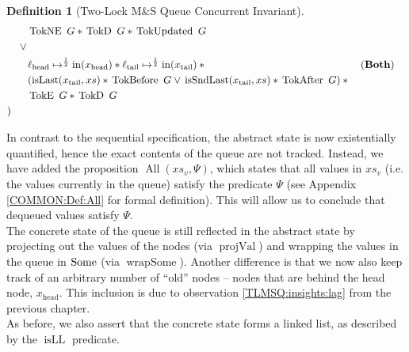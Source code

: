 \documentclass[a4paper, 10pt]{report}
\theoremstyle{definition}
\newtheorem{definition}{Definition}[section]
\newcommand{\msq}{M\&S Queue}
\newcommand{\tlmsq}{Two-Lock \msq{}}
\newcommand{\xsc}{xs}
\newcommand{\isLL}{\operatorname{isLL}}
\newcommand{\AllP}{\operatorname{All}}
\newcommand{\projval}{\operatorname{projVal}}
\newcommand{\wrapsome}{\operatorname{wrapSome}}
\newcommand{\isLast}{\operatorname{isLast}}
\newcommand{\isSndLast}{\operatorname{isSndLast}}
\newcommand{\locN}[1]{\loc_{\mathrm{#1}}}
\newcommand{\lochead}{\locN{head}}
\newcommand{\loctail}{\locN{tail}}
\newcommand{\nIn}[1]{\operatorname{in}(#1)}
\newcommand{\node}{x}
\newcommand{\nodeN}[1]{\node_{\mathrm{#1}}}
\newcommand{\nodehead}{\nodeN{head}}
\newcommand{\nodetail}{\nodeN{tail}}
\newcommand{\absvalueList}{xs_v}
\newcommand{\BothState}{\textbf{Both}\xspace}
\newcommand{\Qg}{G}
\newcommand{\TokE}[1]{\operatorname{TokE} ~ #1}
\newcommand{\TokEQg}{\TokE{\Qg}}
\newcommand{\TokNE}[1]{\operatorname{TokNE} ~ #1}
\newcommand{\TokNEQg}{\TokNE{\Qg}}
\newcommand{\TokD}[1]{\operatorname{TokD} ~ #1}
\newcommand{\TokDQg}{\TokD{\Qg}}
\newcommand{\TokBefore}[1]{\operatorname{TokBefore} ~ #1}
\newcommand{\TokBeforeQg}{\TokBefore{\Qg}}
\newcommand{\TokAfter}[1]{\operatorname{TokAfter} ~ #1}
\newcommand{\TokAfterQg}{\TokAfter{\Qg}}
\newcommand{\TokUpdated}[1]{\operatorname{TokUpdated} ~ #1}
\newcommand{\TokUpdatedQg}{\TokUpdated{\Qg}}
\begin{document}
\begin{definition}[\tlmsq{} Concurrent Invariant]
\begin{align*}
    &\quad\quad \TokNEQg \star{} \TokDQg \star{} \TokUpdatedQg\\
    &\quad\lor{}\\
    &\quad\quad\lochead \mapsto^{\frac{1}{2}} \nIn{\nodehead} \star{} \loctail \mapsto^{\frac{1}{2}} \nIn{\nodetail} \star{} &&\text{(\BothState)}\\
    &\quad\quad (\isLast(\nodetail, \xsc) \star{} \TokBeforeQg \lor{} \isSndLast(\nodetail, \xsc) \star{} \TokAfterQg) \star{} \\
    &\quad\quad \TokEQg \star{} \TokDQg\\
    &)
  \end{align*}
\end{definition}
In contrast to the sequential specification, the abstract state is now existentially quantified, hence the exact contents of the queue are not tracked. Instead, we have added the proposition $\AllP(\absvalueList, \Psi)$, which states that all values in $\absvalueList$ (i.e. the values currently in the queue) satisfy the predicate $\Psi$ (see Appendix \ref{COMMON:Def:All} for formal definition). This will allow us to conclude that dequeued values satisfy $\Psi$.\\
The concrete state of the queue is still reflected in the abstract state by projecting out the values of the nodes (via $\projval$) and wrapping the values in the queue in $\operatorname{Some}$ (via $\wrapsome$). Another difference is that we now also keep track of an arbitrary number of ``old'' nodes -- nodes that are behind the head node, $\nodehead$. This inclusion is due to observation \ref{TLMSQ:insights:lag} from the previous chapter.\\
As before, we also assert that the concrete state forms a linked list, as described by the $\isLL$ predicate.\\
\end{document}
